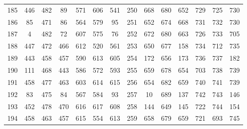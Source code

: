 \begin{apendicesenv}
\begin{table}[H]
\begin{tabular}{@{}ccccccc@{\hspace{1.0cm}}ccccccc@{}}
		185 &  446 &  482 &   89 &  571 &  606 &  541 & 250 &  668 &  680 &  652 &  729 &  725 &  730 \\
		186 &   85 &  471 &   86 &  564 &  579 &   95 & 251 &  652 &  674 &  668 &  731 &  732 &  730 \\
		187 &    4 &  482 &   72 &  607 &  575 &   76 & 252 &  672 &  680 &  663 &  726 &  733 &  705 \\
		188 &  447 &  472 &  466 &  612 &  520 &  561 & 253 &  650 &  677 &  158 &  734 &  712 &  735 \\
		189 &  443 &  458 &  457 &  590 &  613 &  605 & 254 &  172 &  656 &  173 &  736 &  737 &  182 \\
		190 &  111 &  468 &  443 &  586 &  572 &  593 & 255 &  659 &  678 &  654 &  703 &  738 &  739 \\
		191 &  458 &  477 &  463 &  603 &  614 &  615 & 256 &  654 &  682 &  659 &  740 &  741 &  739 \\
		192 &   83 &  475 &   84 &  567 &  584 &   93 & 257 &   10 &  689 &  137 &  742 &  743 &  146 \\
		193 &  452 &  478 &  470 &  616 &  617 &  608 & 258 &  144 &  649 &  145 &  722 &  744 &  154 \\
		194 &  458 &  463 &  457 &  615 &  554 &  613 & 259 &  658 &  679 &  659 &  721 &  693 &  745 \\
		\bottomrule
	\end{tabular}
\end{table}


\end{apendicesenv}
